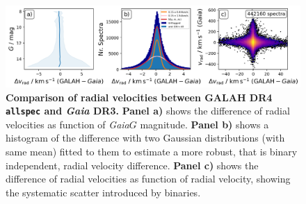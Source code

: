 \documentclass[
  journal=pasa,
  manuscript=research-paper, %
  year=2024,
  volume=37
]{cup-journal}
\newcommand{\Gaia}{\textit{Gaia}\xspace}
\begin{document}
\begin{figure}[ht]
 \centering
 \includegraphics[width=\textwidth]{figures/galah_dr4_vrad_gaia_dr3.png}
 \caption{\textbf{Comparison of radial velocities between GALAH DR4 \texttt{allspec} and \Gaia DR3.}
 \textbf{Panel a)} shows the difference of radial velocities as function of \Gaia $G$ magnitude.
 \textbf{Panel b)} shows a histogram of the difference with two Gaussian distributions (with same mean) fitted to them to estimate a more robust, that is binary independent, radial velocity difference.
 \textbf{Panel c)} shows the difference of radial velocities as function of radial velocity, showing the systematic scatter introduced by binaries.
}
 \label{fig:galah_dr4_vrad_gaia_dr3}
\end{figure}
\end{document}
